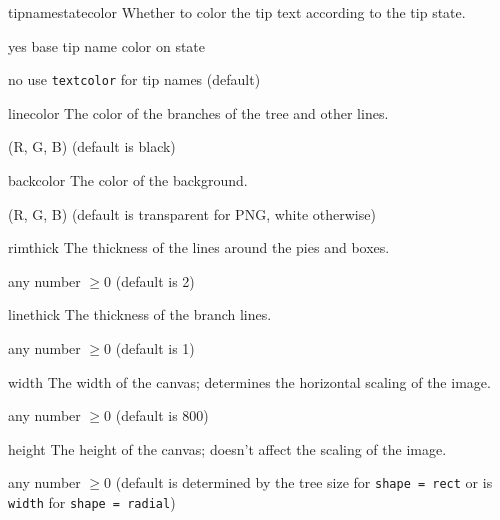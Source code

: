\documentclass[10pt]{article}
\begin{document}
\begin{optdescrip}
	\item[tipnamestatecolor] Whether to color the tip text according to the tip state.
		\begin{valdescrip}
			\item[yes] base tip name color on state
			\item[no] use \texttt{textcolor} for tip names (default)
		\end{valdescrip}

	\item[linecolor] The color of the branches of the tree and other lines.
		\begin{valdescrip}
			\item[(R, G, B)] (default is black)
		\end{valdescrip}

	\item[backcolor] The color of the background.
		\begin{valdescrip}
			\item[(R, G, B)] (default is transparent for PNG, white otherwise)
		\end{valdescrip}

	\item[rimthick] The thickness of the lines around the pies and boxes.
		\begin{valdescrip}
			\item[]  any number $\ge 0$ (default is 2)
		\end{valdescrip}

	\item[linethick] The thickness of the branch lines.
		\begin{valdescrip}
			\item[]  any number $\ge 0$ (default is 1)
		\end{valdescrip}

	\item[width] The width of the canvas; determines the horizontal scaling of the image.
		\begin{valdescrip}
			\item[]  any number $\ge 0$ (default is 800)
		\end{valdescrip}

	\item[height] The height of the canvas; doesn't affect the scaling of the image.
		\begin{valdescrip}
			\item[]  any number $\ge 0$ (default is determined by the tree size for \texttt{shape = rect} or is \texttt{width} for \texttt{shape = radial})
		\end{valdescrip}


\end{optdescrip}
\end{document}
